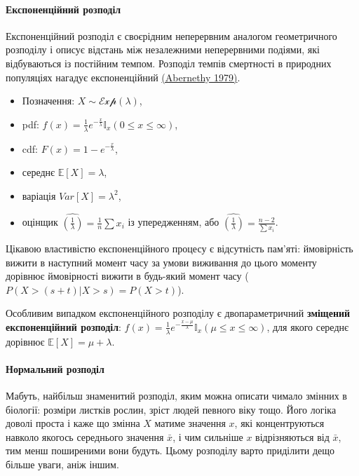 \documentclass[
  11pt,
]{book}
\begin{document}
\paragraph{Експоненційний розподіл}\label{ux435ux43aux441ux43fux43eux43dux435ux43dux446ux456ux439ux43dux438ux439-ux440ux43eux437ux43fux43eux434ux456ux43b}

Експоненційний розподіл є своєрідним неперервним аналогом геометричного розподілу і описує відстань між незалежними неперервними подіями, які відбуваються із постійним темпом. Розподіл темпів смертності в природних популяціях нагадує експоненційний \href{https://doi.org/10.1016/0022-5193(79)90098-5}{(Abernethy 1979)}.

\begin{itemize}
\item
  Позначення: \(X \sim \mathcal{Exp}(\lambda)\),
\item
  pdf: \(f(x) = \frac{1}{\lambda} e^{-\frac{x}{\lambda}} \mathbb{I}_x (0 \leq x \leq \infty)\),
\item
  cdf: \(F(x) = 1 - e^{-\frac{x}{\lambda}}\),
\item
  середнє \(\mathbb{E} [X] = \lambda\),
\item
  варіація \(Var[X] = \lambda^2\),
\item
  оцінщик \(\hat{(\frac{1}{\lambda})} = \frac{1}{n} \sum x_i\) із упередженням, або \(\hat{(\frac{1}{\lambda})} = \frac{n-2}{\sum x_i}\).
\end{itemize}

Цікавою властивістю експоненційного процесу є відсутність пам'яті: ймовірність вижити в наступний момент часу за умови виживання до цього моменту дорівнює ймовірності вижити в будь-який момент часу (\(P(X > (s+t)|X > s) = P(X > t)\)).

Особливим випадком експоненційного розподілу є двопараметричний \textbf{зміщений експоненційний розподіл}: \(f(x) = \frac{1}{\lambda} e^{-\frac{x - \mu}{\lambda}} \mathbb{I}_x (\mu \leq x \leq \infty)\), для якого середнє дорівнює \(\mathbb{E}[X] = \mu + \lambda\).

\paragraph{Нормальний розподіл}\label{norm-dirstr}

Мабуть, найбільш знаменитий розподіл, яким можна описати чимало змінних в біології: розміри листків рослин, зріст людей певного віку тощо. Його логіка доволі проста і каже що змінна \(X\) матиме значення \(x\), які концентруються навколо якогось середнього значення \(\bar{x}\), і чим сильніше \(x\) відрізняються від \(\bar{x}\), тим менш поширеними вони будуть. Цьому розподілу варто приділити дещо більше уваги, аніж іншим.
\end{document}
